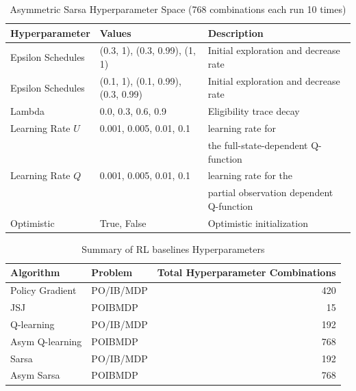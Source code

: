 \begin{table}[h]
\centering
\small
\caption{Asymmetric Sarsa Hyperparameter Space (768 combinations each run 10 times)}\label{tab:hp-sarsa}
\begin{tabular}{lll}
\toprule
\textbf{Hyperparameter} & \textbf{Values} & \textbf{Description} \\
\midrule
Epsilon Schedules & (0.3, 1), (0.3, 0.99), (1, 1) & Initial exploration and decrease rate \\
Epsilon Schedules & (0.1, 1), (0.1, 0.99), (0.3, 0.99) & Initial exploration and decrease rate \\
Lambda & 0.0, 0.3, 0.6, 0.9 & Eligibility trace decay \\
Learning Rate $U$ & 0.001, 0.005, 0.01, 0.1 & learning rate for \\
 & & the full-state-dependent Q-function \\
Learning Rate $Q$ & 0.001, 0.005, 0.01, 0.1 & learning rate for the \\
 & & partial observation dependent Q-function \\
Optimistic & True, False & Optimistic initialization \\
\bottomrule
\end{tabular}
\end{table}

\begin{table}[h]
    \centering
    \caption{Summary of RL baselines Hyperparameters}
    \begin{tabular}{llr}
    \toprule
    \textbf{Algorithm} & \textbf{Problem} & \textbf{Total Hyperparameter Combinations} \\
    \midrule
    Policy Gradient & PO/IB/MDP & 420 \\
    JSJ & POIBMDP & 15 \\
    Q-learning & PO/IB/MDP & 192 \\
    Asym Q-learning & POIBMDP & 768 \\
    Sarsa & PO/IB/MDP & 192 \\
    Asym Sarsa & POIBMDP & 768 \\
    \bottomrule
    \end{tabular}
    \end{table}


